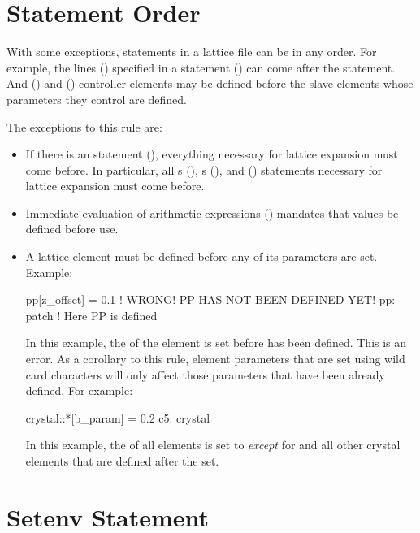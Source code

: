 {{{{{%
\section{Statement Order}
\label{s:state.order}

With some exceptions, statements in a lattice file can be in any order. For example, the lines
() specified in a  statement () can come after the 
statement. And  () and  () controller elements
may be defined before the slave elements whose parameters they control are defined.

The exceptions to this rule are:
\begin{itemize}
\item 
If there is an  statement (), everything necessary for
lattice expansion must come before. In particular, all s
(), s (), and  () statements
necessary for lattice expansion must come before.
\item
Immediate evaluation of arithmetic expressions () mandates that values be defined
before use.
\item
A lattice element must be defined before any of its parameters are set. Example:
\begin{example2}
  pp[z_offset] = 0.1    ! WRONG! PP HAS NOT BEEN DEFINED YET!
  pp: patch             ! Here PP is defined
\end{example2}
In this example, the  of the element  is set before  has been
defined. This is an error. As a corollary to this rule, element parameters that are set 
using wild card characters will only affect those parameters that have been already defined. For
example:
\begin{example2}
  crystal::*[b_param] = 0.2
  c5: crystal
\end{example2}
In this example, the  of all  elements is set to  {\em except} for
 and all other crystal elements that are defined after the set.
\end{itemize}

\section{Setenv Statement}
\label{s:setenv}

}}}}}
